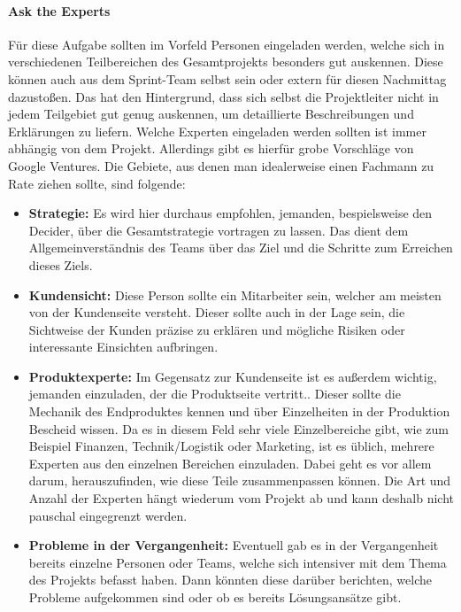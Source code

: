 \paragraph{Ask the Experts}
Für diese Aufgabe sollten im Vorfeld Personen eingeladen werden, welche sich in verschiedenen Teilbereichen des Gesamtprojekts besonders gut auskennen. Diese können auch aus dem Sprint-Team selbst sein oder extern für diesen Nachmittag dazustoßen. Das hat den Hintergrund, dass sich selbst die Projektleiter nicht in jedem Teilgebiet gut genug auskennen, um detaillierte Beschreibungen und Erklärungen zu liefern. Welche Experten eingeladen werden sollten ist immer abhängig von dem Projekt. Allerdings gibt es hierfür grobe Vorschläge von Google Ventures.
Die Gebiete, aus denen man idealerweise einen Fachmann zu Rate ziehen sollte, sind folgende: 
\begin{itemize}
	\item \textbf{Strategie:}
	Es wird hier durchaus empfohlen, jemanden, bespielsweise den Decider, über die Gesamtstrategie vortragen zu lassen. Das dient dem Allgemeinverständnis des Teams über das Ziel und die Schritte zum Erreichen dieses Ziels. 
	\item \textbf{Kundensicht:}
	Diese Person sollte ein Mitarbeiter sein, welcher am meisten von der Kundenseite versteht. Dieser sollte auch in der Lage sein, die Sichtweise der Kunden präzise zu erklären und mögliche Risiken oder interessante Einsichten aufbringen.
	\item \textbf{Produktexperte:}
	Im Gegensatz zur Kundenseite ist es außerdem wichtig, jemanden einzuladen, der die Produktseite vertritt.. Dieser sollte die Mechanik des Endproduktes kennen und über Einzelheiten in der Produktion Bescheid wissen. Da es in diesem Feld sehr viele Einzelbereiche gibt, wie zum Beispiel Finanzen, Technik/Logistik oder Marketing, ist es üblich, mehrere Experten aus den einzelnen Bereichen einzuladen. Dabei geht es vor allem darum, herauszufinden, wie diese Teile zusammenpassen können. Die Art und Anzahl der Experten hängt wiederum vom Projekt ab und kann deshalb nicht pauschal eingegrenzt werden.
	\item \textbf{Probleme in der Vergangenheit:}
	Eventuell gab es in der Vergangenheit bereits einzelne Personen oder Teams, welche sich intensiver mit dem Thema des Projekts befasst haben. Dann könnten diese darüber berichten, welche Probleme aufgekommen sind oder ob es bereits Lösungsansätze gibt.
\end{itemize}

